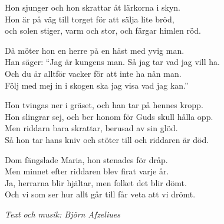 \vspace{10pt}
Hon sjunger och hon skrattar åt lärkorna i skyn.\\
Hon är på väg till torget för att sälja lite bröd,\\ 
och solen stiger, varm och stor, och färgar himlen röd.\par
\vspace{10pt}
Då möter hon en herre på en häst med yvig man.\\
Han säger: ``Jag är kungens man. Så jag tar vad jag vill ha.\\ 
Och du är alltför vacker för att inte ha nån man.\\
Följ med mej in i skogen ska jag visa vad jag kan.''\par
\vspace{10pt}
Hon tvingas ner i gräset, och han tar på hennes kropp.\\
Hon slingrar sej, och ber honom för Guds skull hålla opp.\\
Men riddarn bara skrattar, berusad av sin glöd.\\
Så hon tar hans kniv och stöter till och riddaren är död.\par
\vspace{10pt}
Dom fängslade Maria, hon stenades för dråp.\\
Men minnet efter riddaren blev firat varje år.\\
Ja, herrarna blir hjältar, men folket det blir dömt.\\
Och vi som ser hur allt går till får veta att vi drömt.\par
\vspace{10pt}
{\footnotesize\textit{Text och musik: Björn Afzeliues}}
